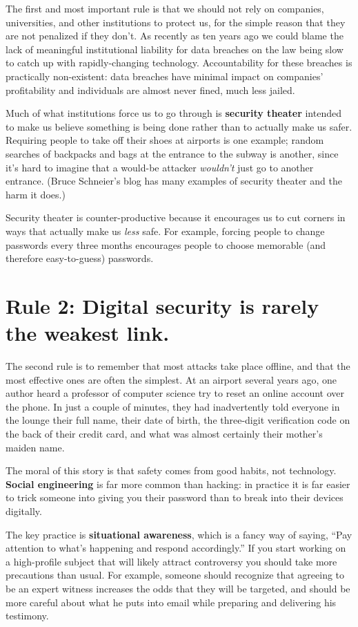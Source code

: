 \documentclass[10pt,letterpaper]{article}
\begin{document}
The first and most important rule is that we should not rely on companies,
universities, and other institutions to protect us, for the simple reason that
they are not penalized if they don't. As recently as ten years ago we could
blame the lack of meaningful institutional liability for data breaches on the
law being slow to catch up with rapidly-changing technology. Accountability for
these breaches is practically non-existent: data breaches have minimal impact on
companies' profitability and individuals are almost never fined, much less
jailed.

Much of what institutions force us to go through is \textbf{security theater}
intended to make us believe something is being done rather than to actually make
us safer. Requiring people to take off their shoes at airports is one example;
random searches of backpacks and bags at the entrance to the subway is another,
since it's hard to imagine that a would-be attacker \emph{wouldn't} just go to
another entrance. (Bruce Schneier's blog \cite{SchnBlog} has many examples of
security theater and the harm it does.)

Security theater is counter-productive because it encourages us to cut corners
in ways that actually make us \emph{less} safe. For example, forcing people to
change passwords every three months encourages people to choose memorable (and
therefore easy-to-guess) passwords.

\section*{Rule 2: Digital security is rarely the weakest link.}

The second rule is to remember that most attacks take place offline, and that
the most effective ones are often the simplest. At an airport several years ago,
one author heard a professor of computer science try to reset an online account
over the phone. In just a couple of minutes, they had inadvertently told
everyone in the lounge their full name, their date of birth, the three-digit
verification code on the back of their credit card, and what was almost
certainly their mother's maiden name.

The moral of this story is that safety comes from good habits, not technology.
\textbf{Social engineering} is far more common than hacking: in practice it is
far easier to trick someone into giving you their password than to break into
their devices digitally.

The key practice is \textbf{situational awareness}, which is a fancy way of
saying, ``Pay attention to what's happening and respond accordingly.'' If you
start working on a high-profile subject that will likely attract controversy you
should take more precautions than usual. For example, someone should recognize
that agreeing to be an expert witness increases the odds that they will be
targeted, and should be more careful about what he puts into email while
preparing and delivering his testimony.
\end{document}
